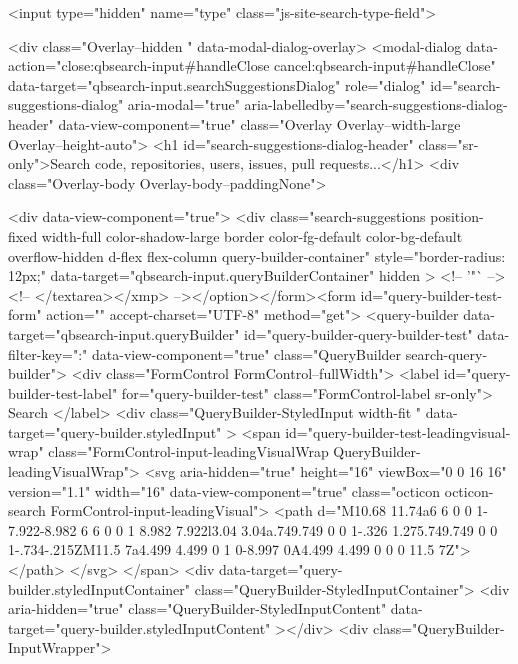     <input type="hidden" name="type" class="js-site-search-type-field">

    
<div class="Overlay--hidden " data-modal-dialog-overlay>
  <modal-dialog data-action="close:qbsearch-input#handleClose cancel:qbsearch-input#handleClose" data-target="qbsearch-input.searchSuggestionsDialog" role="dialog" id="search-suggestions-dialog" aria-modal="true" aria-labelledby="search-suggestions-dialog-header" data-view-component="true" class="Overlay Overlay--width-large Overlay--height-auto">
      <h1 id="search-suggestions-dialog-header" class="sr-only">Search code, repositories, users, issues, pull requests...</h1>
    <div class="Overlay-body Overlay-body--paddingNone">
      
          <div data-view-component="true">        <div class="search-suggestions position-fixed width-full color-shadow-large border color-fg-default color-bg-default overflow-hidden d-flex flex-column query-builder-container"
          style="border-radius: 12px;"
          data-target="qbsearch-input.queryBuilderContainer"
          hidden
        >
          <!-- '"` --><!-- </textarea></xmp> --></option></form><form id="query-builder-test-form" action="" accept-charset="UTF-8" method="get">
  <query-builder data-target="qbsearch-input.queryBuilder" id="query-builder-query-builder-test" data-filter-key=":" data-view-component="true" class="QueryBuilder search-query-builder">
    <div class="FormControl FormControl--fullWidth">
      <label id="query-builder-test-label" for="query-builder-test" class="FormControl-label sr-only">
        Search
      </label>
      <div
        class="QueryBuilder-StyledInput width-fit "
        data-target="query-builder.styledInput"
      >
          <span id="query-builder-test-leadingvisual-wrap" class="FormControl-input-leadingVisualWrap QueryBuilder-leadingVisualWrap">
            <svg aria-hidden="true" height="16" viewBox="0 0 16 16" version="1.1" width="16" data-view-component="true" class="octicon octicon-search FormControl-input-leadingVisual">
    <path d="M10.68 11.74a6 6 0 0 1-7.922-8.982 6 6 0 0 1 8.982 7.922l3.04 3.04a.749.749 0 0 1-.326 1.275.749.749 0 0 1-.734-.215ZM11.5 7a4.499 4.499 0 1 0-8.997 0A4.499 4.499 0 0 0 11.5 7Z"></path>
</svg>
          </span>
        <div data-target="query-builder.styledInputContainer" class="QueryBuilder-StyledInputContainer">
          <div
            aria-hidden="true"
            class="QueryBuilder-StyledInputContent"
            data-target="query-builder.styledInputContent"
          ></div>
          <div class="QueryBuilder-InputWrapper">
